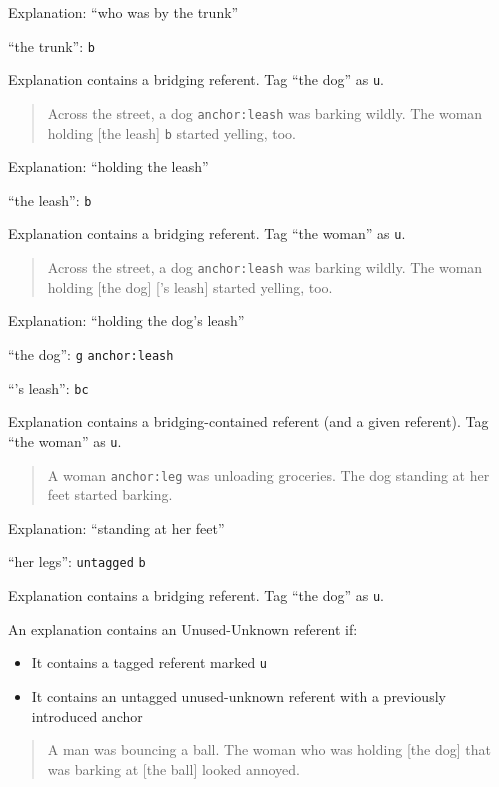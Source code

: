 \documentclass[
]{book}
\providecommand{\tightlist}{%
  \setlength{\itemsep}{0pt}\setlength{\parskip}{0pt}}
\begin{document}
Explanation: ``who was by the trunk''

``the trunk'': \texttt{b}

Explanation contains a bridging referent.
Tag ``the dog'' as \texttt{u}.

\begin{quote}
Across the street, a dog \texttt{anchor:leash} was barking wildly.
The woman holding {[}the leash{]} \texttt{b} started yelling, too.
\end{quote}

Explanation: ``holding the leash''

``the leash'': \texttt{b}

Explanation contains a bridging referent.
Tag ``the woman'' as \texttt{u}.

\begin{quote}
Across the street, a dog \texttt{anchor:leash} was barking wildly.
The woman holding {[}the dog{]} {[}'s leash{]} started yelling, too.
\end{quote}

Explanation: ``holding the dog's leash''

``the dog'': \texttt{g} \texttt{anchor:leash}

``'s leash'': \texttt{bc}

Explanation contains a bridging-contained referent (and a given referent).
Tag ``the woman'' as \texttt{u}.

\begin{quote}
A woman \texttt{anchor:leg} was unloading groceries.
The dog standing at her feet started barking.
\end{quote}

Explanation: ``standing at her feet''

``her legs'': \texttt{untagged} \texttt{b}

Explanation contains a bridging referent.
Tag ``the dog'' as \texttt{u}.

An explanation contains an Unused-Unknown referent if:

\begin{itemize}
\tightlist
\item
  It contains a tagged referent marked \texttt{u}
\item
  It contains an untagged unused-unknown referent with a previously introduced anchor
\end{itemize}

\begin{quote}
A man was bouncing a ball.
The woman who was holding {[}the dog{]} that was barking at {[}the ball{]}
looked annoyed.
\end{quote}
\end{document}
